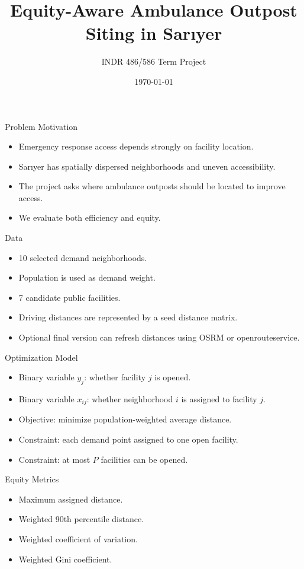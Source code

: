 \documentclass{beamer}
\title{Equity-Aware Ambulance Outpost Siting in Sar{\i}yer}
\author{INDR 486/586 Term Project}
\date{\today}
\begin{document}
\begin{frame}
\titlepage
\end{frame}

\begin{frame}{Problem Motivation}
\begin{itemize}
    \item Emergency response access depends strongly on facility location.
    \item Sar{\i}yer has spatially dispersed neighborhoods and uneven accessibility.
    \item The project asks where ambulance outposts should be located to improve access.
    \item We evaluate both efficiency and equity.
\end{itemize}
\end{frame}

\begin{frame}{Data}
\begin{itemize}
    \item 10 selected demand neighborhoods.
    \item Population is used as demand weight.
    \item 7 candidate public facilities.
    \item Driving distances are represented by a seed distance matrix.
    \item Optional final version can refresh distances using OSRM or openrouteservice.
\end{itemize}
\end{frame}

\begin{frame}{Optimization Model}
\begin{itemize}
    \item Binary variable $y_j$: whether facility $j$ is opened.
    \item Binary variable $x_{ij}$: whether neighborhood $i$ is assigned to facility $j$.
    \item Objective: minimize population-weighted average distance.
    \item Constraint: each demand point assigned to one open facility.
    \item Constraint: at most $P$ facilities can be opened.
\end{itemize}
\end{frame}

\begin{frame}{Equity Metrics}
\begin{itemize}
    \item Maximum assigned distance.
    \item Weighted 90th percentile distance.
    \item Weighted coefficient of variation.
    \item Weighted Gini coefficient.
\end{itemize}
\end{frame}
\end{document}

